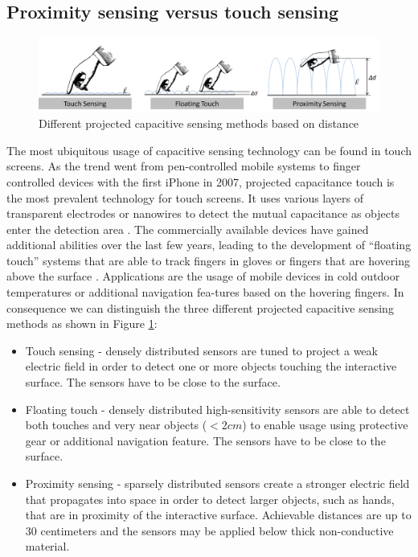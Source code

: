 \subsection{Proximity sensing versus touch sensing}
\begin{figure}[h]
\centering
\includegraphics[width=1.0\textwidth]{images/cap_projected_sensing_methods.png}
\caption{Different projected capacitive sensing methods based on distance}
\label{fig:cap_proj_sensing_methods}
\end{figure} 
The most ubiquitous usage of capacitive sensing technology can be found in touch screens. As the trend went from pen-controlled mobile systems to finger controlled devices with the first iPhone in 2007, projected capacitance touch is the most prevalent technology for touch screens. It uses various layers of transparent electrodes or nanowires to detect the mutual capacitance as objects enter the detection area \cite{Barrett2010}. The commercially available devices have gained additional abilities over the last few years, leading to the development of “floating touch” systems that are able to track fingers in gloves or fingers that are hovering above the surface \cite{Cypress2012, Nokia2012}. Applications are the usage of mobile devices in cold outdoor temperatures or additional navigation fea-tures based on the hovering fingers. In consequence we can distinguish the three different projected capacitive sensing methods as shown in Figure \ref{fig:cap_proj_sensing_methods}:
\begin{itemize}
\item Touch sensing - densely distributed sensors are tuned to project a weak electric field in order to detect one or more objects touching the interactive surface. The sensors have to be close to the surface.
\item Floating touch - densely distributed high-sensitivity sensors are able to detect both touches and very near objects (\(<2cm\)) to enable usage using protective gear or additional navigation feature. The sensors have to be close to the surface.
\item Proximity sensing - sparsely distributed sensors create a stronger electric field that propagates into space in order to detect larger objects, such as hands, that are in proximity of the interactive surface. Achievable distances are up to 30 centimeters and the sensors may be applied below thick non-conductive material.
\end{itemize}

